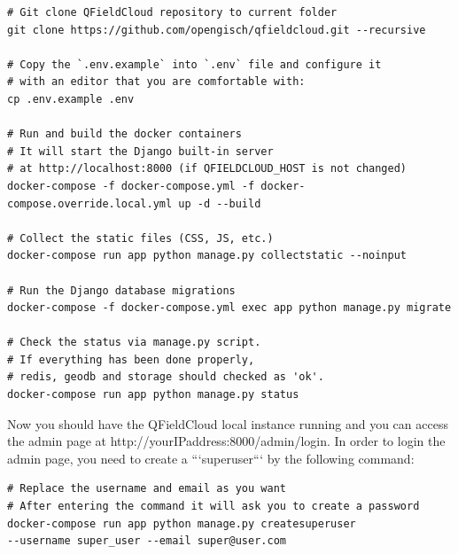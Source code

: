 \documentclass{article}
\begin{document}
\begin{verbatim}
# Git clone QFieldCloud repository to current folder
git clone https://github.com/opengisch/qfieldcloud.git --recursive

# Copy the `.env.example` into `.env` file and configure it 
# with an editor that you are comfortable with:
cp .env.example .env

# Run and build the docker containers
# It will start the Django built-in server 
# at http://localhost:8000 (if QFIELDCLOUD_HOST is not changed) 
docker-compose -f docker-compose.yml -f docker-compose.override.local.yml up -d --build

# Collect the static files (CSS, JS, etc.)
docker-compose run app python manage.py collectstatic --noinput

# Run the Django database migrations
docker-compose -f docker-compose.yml exec app python manage.py migrate

# Check the status via manage.py script. 
# If everything has been done properly, 
# redis, geodb and storage should checked as 'ok'.
docker-compose run app python manage.py status
\end{verbatim}

\begin{markdown}
Now you should have the QFieldCloud local instance running and you can access the admin page at http://yourIPaddress:8000/admin/login. In order to login the admin page, you need to create a ```superuser``` by the following command:
\end{markdown}
\begin{verbatim}
# Replace the username and email as you want
# After entering the command it will ask you to create a password
docker-compose run app python manage.py createsuperuser
--username super_user --email super@user.com
\end{verbatim}
\end{document}
